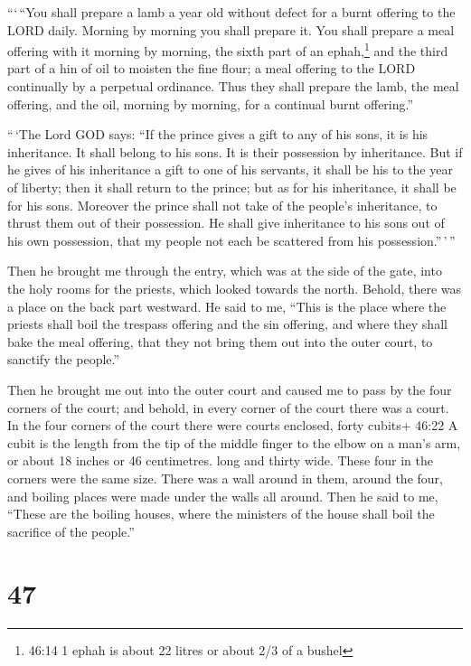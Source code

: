  ```\,``You shall prepare a lamb a year old without defect
for a burnt offering to the LORD daily. Morning by morning you shall
prepare it.  You shall prepare a meal offering with it
morning by morning, the sixth part of an ephah,\footnote{46:14 1 ephah
  is about 22 litres or about 2/3 of a bushel} and the third part of a
hin of oil to moisten the fine flour; a meal offering to the LORD
continually by a perpetual ordinance.  Thus they shall
prepare the lamb, the meal offering, and the oil, morning by morning,
for a continual burnt offering.''

 ``\,`The Lord GOD says: ``If the prince gives a gift to
any of his sons, it is his inheritance. It shall belong to his sons. It
is their possession by inheritance.  But if he gives of his
inheritance a gift to one of his servants, it shall be his to the year
of liberty; then it shall return to the prince; but as for his
inheritance, it shall be for his sons.  Moreover the prince
shall not take of the people's inheritance, to thrust them out of their
possession. He shall give inheritance to his sons out of his own
possession, that my people not each be scattered from his
possession.''\,'\,''

 Then he brought me through the entry, which was at the
side of the gate, into the holy rooms for the priests, which looked
towards the north. Behold, there was a place on the back part westward.
 He said to me, ``This is the place where the priests shall
boil the trespass offering and the sin offering, and where they shall
bake the meal offering, that they not bring them out into the outer
court, to sanctify the people.''

 Then he brought me out into the outer court and caused me
to pass by the four corners of the court; and behold, in every corner of
the court there was a court.  In the four corners of the
court there were courts enclosed, forty cubits+ 46:22 A cubit is the
length from the tip of the middle finger to the elbow on a man's arm, or
about 18 inches or 46 centimetres. long and thirty wide. These four in
the corners were the same size.  There was a wall around in
them, around the four, and boiling places were made under the walls all
around.  Then he said to me, ``These are the boiling
houses, where the ministers of the house shall boil the sacrifice of the
people.''

\hypertarget{section-45}{%
\section{47}\label{section-45}}

